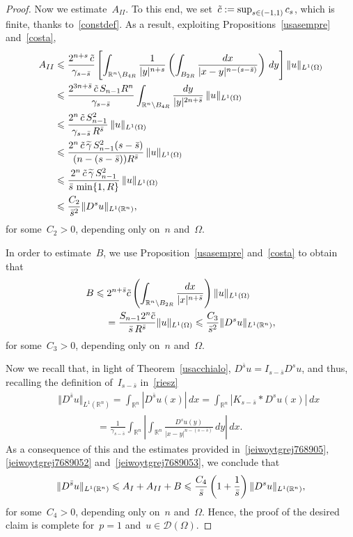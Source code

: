\documentclass[11pt,hyp,]{nyjm}
\numberwithin{equation}{section}
\newcommand{\R}{\mathbb{R}}
\theoremstyle{remark}
\newcommand{\Int}{\int_{\mathbb{R}^n}}
\newcommand{\bs}{\Bar{s}}
\renewcommand{\leq}{\leqslant}
\renewcommand{\le}{\leqslant}
\begin{document}
\begin{proof}
Now we estimate~$A_{II}$. 
To this end, we set~$\Tilde{c}:= \sup_{s \in(-1,1)} c_{s}$, which is finite, thanks to~\eqref{constdef}.
As a result, 
exploiting Propositions~\ref{usasempre} and~\ref{costa},
\begin{equation}\label{jeiwoytgrej7689052}\begin{split}
			A_{II}& \leq \frac{ 2 ^{n+s}\,\Tilde{c}}{\gamma_{s-\bar{s}}} \left[ \int_{\R^n \setminus B_{4R}} \frac{1}{|y|^{n+s}} \left( \int_{B_{2R}} \frac{dx}{|x-y|^{n-(s-\bar{s})}} \right) \, dy \right] \Vert u \Vert_{L^1(\Omega)}	 \\ 
& \leq \frac{ 2^{3n+\bs}\,\Tilde{c} \,S_{n-1} R^n}{\gamma_{s-\bar{s}}} \int_{\R^n \setminus B_{4R}} \frac{dy}{|y|^{2n + \bar{s}}}\,\Vert u \Vert_{L^1(\Omega)}  \\&
\le\frac{ 2^{n}\,\Tilde{c} \,S^2_{n-1}}{\gamma_{s-\bar{s}} \, R^{\bs} } \,\Vert u \Vert_{L^1(\Omega)} \\
& \le 
\frac{ 2^{n}\,\Tilde{c} \,\widetilde\gamma\,S^2_{n-1}(s-\bs)}{(n-(s-\bs)) R^{\bs} } \,\Vert u \Vert_{L^1(\Omega)}\\& \le
\frac{ 2^{n}\,\Tilde{c} \,\widetilde\gamma\,S^2_{n-1}}{\bs\,\min\{1, R\} } \,\Vert u \Vert_{L^1(\Omega)}\\&
\le\frac{ C_2}{\bar{s}^2} \Vert D^s u \Vert_{L^1(\R^n)},
			\end{split}\end{equation} for some~$ C_2>0$, depending
			only on~$n$ and~$\Omega$.

In order to estimate~$B$, we use Proposition~\ref{usasempre} and~\ref{costa}
to obtain that
\begin{equation}\label{jeiwoytgrej7689053}\begin{split}&
B \leq 2^{n+\bar{s}} \Tilde{c} \left( \int_{\R^n \setminus B_{2R}}\frac{dx}{|x|^{n+\bs}}\right) \Vert u \Vert_{L^1(\Omega)} 
\\&\qquad= \frac{ S_{n-1} 2^{n} \Tilde{c}}{\bar{s}\,R^{\bar{s}}}  \Vert u \Vert_{L^1(\Omega)}
\leq \frac{C_3}{\bar{s}^2} \Vert  D^s u \Vert_{L^1(\R^n)},\end{split}
\end{equation} for some~$C_3>0$, depending only on~$n$ and~$\Omega$.
			
Now we recall that, in light of Theorem~\ref{usacchialo}, $D^{\bar{s}}u =I_{s-\bar{s}} D^s u$, and thus, recalling the definition of~$I_{s-\bar{s}}$ 
in~\eqref{riesz}
\begin{eqnarray*}&& \Vert D^{\bar{s}}u \Vert_{L^1(\R^n)}=\int_{\R^n}| D^{\bar{s}}u(x)|\,dx
=\int_{\R^n}| K_{s-\bar s} \ast D^su(x)|\,dx\\&&\qquad\qquad
=\frac{1}{\gamma_{s-\bar s}}\int_{\R^n}\left|
\Int \frac{D^su(y)}{|x-y|^{n-(s-\bar s)}} \, dy\right|\,dx.\end{eqnarray*}
As a consequence of this and the estimates provided in~\eqref{jeiwoytgrej768905},
\eqref{jeiwoytgrej7689052} and~\eqref{jeiwoytgrej7689053}, we conclude that
$$
\Vert D^{\bar{s}}u \Vert_{L^1(\R^n)} \leq A_{I} + A_{II} + B\le\frac{C_4}{\bs}\left(1+\frac{1}{\bs}\right) \Vert  D^s u \Vert_{L^1(\R^n)},
$$ for some~$C_4>0$, depending only on~$n$ and~$\Omega$.
Hence, the proof of the desired claim
is complete for~$p=1$ and~$u \in \mathcal{D}(\Omega)$.
			

\end{proof}
\end{document}
